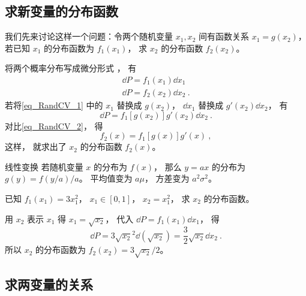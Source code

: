 

\subsection{求新变量的分布函数}

我们先来讨论这样一个问题：令两个随机变量 $x_1, x_2$ 间有函数关系 $x_1 = g(x_2)$， 若已知 $x_1$ 的分布函数为 $f_1(x_1)$， 求 $x_2$ 的分布函数 $f_2(x_2)$。

将两个概率分布写成微分形式%
， 有
\begin{gather}
\dd{P} = f_1(x_1) \dd{x_1}\label{eq_RandCV_1}\\
\dd{P} = f_2(x_2) \dd{x_2} \label{eq_RandCV_2}~.
\end{gather}
若将\autoref{eq_RandCV_1} 中的 $x_1$ 替换成 $g(x_2)$， $\dd{x_1}$ 替换成 $g'(x_2)\dd{x_2}$， 有
\begin{equation}
\dd{P} = f_1[g(x_2)] g'(x_2) \dd{x_2}~.
\end{equation}
对比\autoref{eq_RandCV_2}， 得
\begin{equation}
f_2(x) = f_1[g(x)] g'(x)~,
\end{equation}
这样， 就求出了 $x_2$ 的分布函数 $f_2(x)$。

\begin{example}{线性变换}\label{ex_RandCV_1}
若随机变量 $x$ 的分布为 $f(x)$， 那么 $y = ax$ 的分布为 $g(y) = f(y/a)/a$。 平均值变为 $a\mu$， 方差变为 $a^2\sigma^2$。
\end{example}

\begin{example}{}
已知 $f_1(x_1) = 3x_1^2$， $x_1 \in [0, 1]$， $x_2 = x_1^2$， 求 $x_2$ 的分布函数。

用 $x_2$ 表示 $x_1$ 得 $x_1 = \sqrt{x_2}$， 代入 $\dd{P} = f_1(x_1)\dd{x_1}$， 得
\begin{equation}
\dd{P} = 3\sqrt{x_2}^2 \dd(\sqrt{x_2}) = \frac32 \sqrt{x_2} \dd{x_2}~.
\end{equation}
所以 $x_2$ 的分布函数为 $f_2(x_2) = 3\sqrt{x_2}/2$。
\end{example}

\subsection{求两变量的关系}

